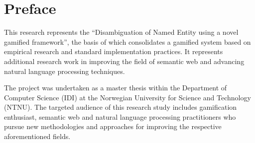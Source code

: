 \hypersetup{pageanchor=false}
%

\chapter*{Preface}


This research represents the “Disambiguation of Named Entity using a novel gamified framework”, the basis of which consolidates a gamified system based on empirical research and standard implementation practices. It represents additional research work in improving the field of semantic web and advancing natural language processing techniques. 

The project was undertaken as a master thesis within the Department of Computer Science (IDI) at the Norwegian University for Science and Technology (NTNU). The targeted audience of this research study includes gamification enthusiast, semantic web and natural language processing practitioners who pursue new methodologies and approaches for improving the respective aforementioned fields. \\[2cm]

\thesisdate \\[1pc]
\\[1pc]
